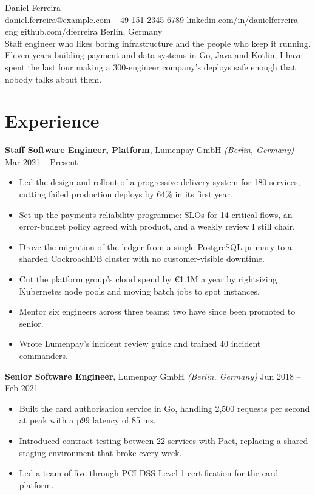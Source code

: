\documentclass[10pt,a4paper]{article}
\begin{document}
{\fontsize{24}{28}\selectfont\color{ink} Daniel Ferreira}\\[3pt]
daniel.ferreira@example.com \textbar{} +49 151 2345 6789 \textbar{} linkedin.com/in/danielferreira-eng \textbar{} github.com/dferreira \textbar{} Berlin, Germany\\[6pt]
Staff engineer who likes boring infrastructure and the people who keep it running. Eleven years building payment and data systems in Go, Java and Kotlin; I have spent the last four making a 300-engineer company's deploys safe enough that nobody talks about them.
\section*{Experience}
\textbf{Staff Software Engineer, Platform}, Lumenpay GmbH \textit{(Berlin, Germany)} \hfill Mar 2021 -- Present\\[-2pt]
\begin{itemize}
\item Led the design and rollout of a progressive delivery system for 180 services, cutting failed production deploys by 64\% in its first year.
\item Set up the payments reliability programme: SLOs for 14 critical flows, an error-budget policy agreed with product, and a weekly review I still chair.
\item Drove the migration of the ledger from a single PostgreSQL primary to a sharded CockroachDB cluster with no customer-visible downtime.
\item Cut the platform group's cloud spend by €1.1M a year by rightsizing Kubernetes node pools and moving batch jobs to spot instances.
\item Mentor six engineers across three teams; two have since been promoted to senior.
\item Wrote Lumenpay's incident review guide and trained 40 incident commanders.
\end{itemize}
\textbf{Senior Software Engineer}, Lumenpay GmbH \textit{(Berlin, Germany)} \hfill Jun 2018 -- Feb 2021\\[-2pt]
\begin{itemize}
\item Built the card authorisation service in Go, handling 2,500 requests per second at peak with a p99 latency of 85 ms.
\item Introduced contract testing between 22 services with Pact, replacing a shared staging environment that broke every week.
\item Led a team of five through PCI DSS Level 1 certification for the card platform.
\end{itemize}
\end{document}
